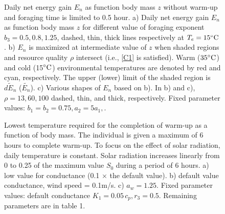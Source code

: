 \begin{figure}[H]
\begin{center}
\caption{
	 Daily net energy gain  $E_n$ as function body mass $z$ without warm-up and foraging time is limited to 0.5 hour.
	a) Daily net energy gain  $E_n$ as function body mass $z$ for different value of foraging exponent $b_3 = 0.5, 0.8, 1.25$, dashed, thin, thick lines respectively  at $T_e  = 15 ^{\circ} \rm{C}$.
	b) $E_n$ is maximized at intermediate value of $z$  when shaded regions and resource quality $\rho$ intersect (i.e., \cref{C1} is satisfied).
	Warm ($35^{\circ} \rm{C}$) and cold (15$^{\circ} \rm{C}$) environmental temperatures are denoted by red and cyan, respectively.
	The upper (lower) limit of the shaded region is $\widetilde{dE_n}$ ($\widetilde{E_n}$).  
	c) Various shapes of $E_n$ based on b).
	In b) and c), $\rho = 13, 60, 100$ dashed, thin, and thick, respectively.
	Fixed parameter values: $b_1 = b_2 = 0.75, a_2 = 5 a_1, $.
}
\label{fig3}
\end{center}
\end{figure}
%
\begin{figure}[H]
\begin{center}
\caption{
	Lowest temperature required for the completion of warm-up as a function of body mass.
	The individual is given a maximum of 6 hours to complete warm-up.
	To focus on the effect of solar radiation, daily temperature is constant.
	Solar radiation increases linearly from 0 to 0.25 of the maximum value $S_0$ during a period of 6 hours. 
	a)  low value for conductance (0.1 $\times$ the default value).
	b) default value conductance, wind speed  = 0.1m/s.
	c)  $a_w = 1.25$. 
	Fixed parameter values: default conductance $K_1 = 0.05 \, c_p, r_3 = 0.5$.
	Remaining parameters are in table 1.
}%
\label{fig4}
\end{center}
\end{figure}
